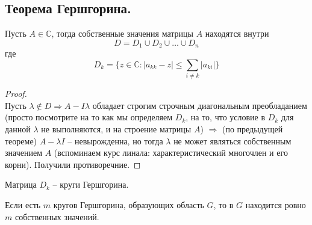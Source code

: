 \subsection{Теорема Гершгорина.}
\begin{theorem*}
    Пусть $A \in \mathbb{C}$, тогда собственные значения матрицы $A$ находятся внутри\\
    \[D = D_1 \cup D_2 \cup \ldots \cup D_n\] где
    \[ \displaystyle D_k = \{z \in \mathbb{C} : |a_{kk} - z| \leqslant \sum_{i \neq k}|a_{ki}|\}\]  
\end{theorem*}
\begin{proof} \ \\
    Пусть $\lambda \not \in D \Rightarrow A - I\lambda$ обладает строгим строчным
    диагональным преобладанием (просто посмотрите на то как мы определяем $D_k$, на то, что условие
    в $D_k$ для данной $\lambda$ не выполняются, и на строение
    матрицы $A$) $\Rightarrow$ (по предыдущей теореме) $A - \lambda I$ -- невырожденна, но
    тогда $\lambda$ не может являться собственным значением $A$ (вспоминаем курс линала: характеристический
    многочлен и его корни). Получили противоречние.
\end{proof}

\begin{definition*}
    Матрица $D_k$ -- круги Гершгорина.
\end{definition*}


\begin{theorem*}
    Если есть $m$ кругов Гершгорина, образующих область $G$, то в $G$ находится ровно
    $m$ собственных значений.
\end{theorem*}